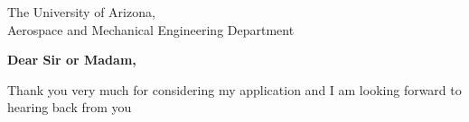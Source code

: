 \documentclass[12pt]{letter} %
\begin{document}

\begin{letter}{The University of Arizona,\\ Aerospace and Mechanical Engineering Department  } %

\opening{\noindent\textbf{Dear Sir or Madam, }}



\indent Thank you very much for considering my application and I am looking forward to hearing back from you \\ 

\begin{comment}
\begin{minipage}{1.1\linewidth}
\begin{flushright}
\vspace{3\parskip } %
\closing{Sincerely,\\ 
\vspace{3pt}\texttt{[image: ../PDF/Signature]} }\vspace{2\parskip}
\end{flushright}
\end{minipage}
\end{comment}



\end{letter}
\end{document}

